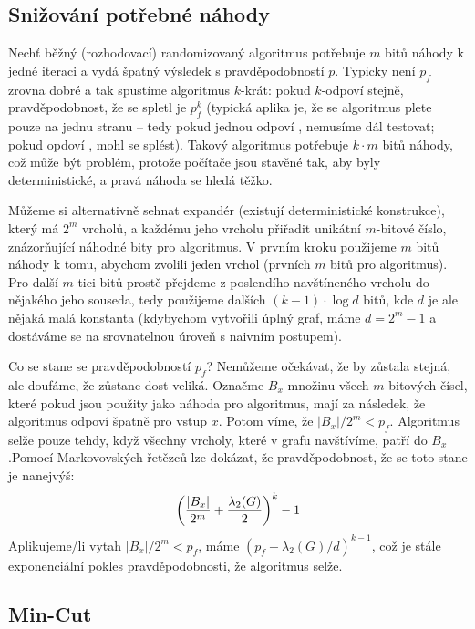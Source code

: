 \subsection{Snižování potřebné náhody}

Nechť běžný (rozhodovací) randomizovaný algoritmus potřebuje $m$ bitů náhody k jedné iteraci a
vydá špatný výsledek s pravděpodobností $p$. Typicky není $p_f$ zrovna dobré a tak
spustíme algoritmus $k$-krát: pokud $k$-odpoví stejně, pravděpodobnost, že se
spletl je $p_f^k$ (typická aplika je, že se algoritmus plete pouze na jednu
stranu -- tedy pokud jednou odpoví , nemusíme dál testovat; pokud opdoví
, mohl se splést). Takový algoritmus potřebuje $k\cdot m$ bitů náhody, což může být problém,
protože počítače jsou stavěné tak, aby byly deterministické, a pravá náhoda se
hledá těžko.

Můžeme si alternativně sehnat expandér (existují deterministické konstrukce),
který má $2^m$ vrcholů, a každému jeho vrcholu přiřadit unikátní $m$-bitové
číslo, znázorňující náhodné bity pro algoritmus. V prvním kroku použijeme $m$
bitů náhody k tomu, abychom zvolili jeden vrchol (prvních $m$ bitů pro
algoritmus). Pro další $m$-tici bitů prostě přejdeme z poslendího navštíneného
vrcholu do nějakého jeho souseda, tedy použijeme dalších $(k -1) \cdot \log d$ bitů, kde $d$
je ale nějaká malá konstanta (kdybychom vytvořili úplný graf, máme $d = 2^m-1$ a
dostáváme se na srovnatelnou úroveň s naivním postupem).

Co se stane se pravděpodobností $p_f$? Nemůžeme očekávat, že by zůstala stejná,
ale doufáme, že zůstane dost veliká. Označme $B_x$ množinu všech $m$-bitových
čísel, které pokud jsou použity jako náhoda pro algoritmus, mají za následek, že
algoritmus odpoví špatně pro vstup $x$. Potom víme, že $|B_x|/2^m < p_f$.
Algoritmus selže pouze tehdy, když všechny vrcholy, které v grafu navštívíme,
patří do $B_x$.Pomocí Markovovských řetězců lze dokázat, že pravděpodobnost, že
se toto stane je nanejvýš:
\begin{align}
		\left({|B_x| \over 2^m} + {\lambda_2(G) \over 2}\right)^k-1
\end{align}
Aplikujeme/li vytah $|B_x|/2^m < p_f$, máme $(p_f + \lambda_2(G)/d)^{k-1}$, což
je stále exponenciální pokles pravděpodobnosti, že algoritmus selže.

\subsection{Min-Cut}

